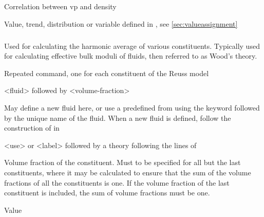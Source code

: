 {
 \slist
   \item \Description Correlation between vp and density
   \item \Argument Value, trend, distribution or variable defined in , see \autoref{sec:valueassignment}
   \item {}
 \elist

\subparagraph{}
 \slist
   \item \Description Used for calculating the harmonic average of various constituents. Typically used for calculating effective bulk moduli of fluids, then referred to as Wood's theory.
   \item \Argument
   \item \Default
 \elist

 \slist
   \item \Description Repeated command, one for each constituent of the Reuss model
   \item \Argument <fluid> followed by <volume-fraction>
   \item \Default
 \elist

 \slist
   \item \Description May define a new fluid here, or use a predefined  from  using the keyword  followed by the unique name of the fluid. When a new fluid is defined, follow the construction of  in 
   \item \Argument <use> or <label> followed by a theory following the lines of 
   \item \Default
 \elist

 \slist
   \item \Description Volume fraction of the constituent. Must to be specified for all but the last constituents, where it may be calculated to ensure that the sum of the volume fractions of all the constituents is one. If the volume fraction of the last constituent is included, the sum of volume fractions must be one.
   \item \Argument Value
   \item \Default
 \elist

}
